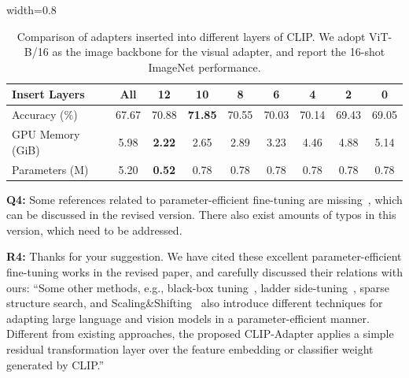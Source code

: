 \documentclass[default]{sn-jnl}%
\theoremstyle{thmstyleone}%
\theoremstyle{thmstyletwo}%
\theoremstyle{thmstylethree}%
\begin{document}
\begin{table}[h]
\centering
\caption{Comparison of adapters inserted into different layers of CLIP. We adopt ViT-B/16 as the image backbone for the visual adapter, and report the 16-shot ImageNet performance.}
\vspace*{5pt}
\begin{adjustbox}{width=0.8\linewidth}
	\begin{tabular}{lcccccccc}
	\toprule
		Insert Layers & All    & 12  &  10  &  8 & 6 & 4 & 2 &0 \\
		\midrule
		Accuracy (\%)  & 67.67		&70.88		&\textbf{71.85}	&70.55		&70.03		&70.14	   	&69.43		&69.05 \\
		GPU Memory (GiB)  & 5.98	 &	\textbf{2.22}		 &2.65	 &	2.89	 &	3.23		 &4.46		 &4.88		 &5.14 \\
            Parameters (M)  & 5.20	&	\textbf{0.52}		&0.78		&0.78	&	0.78		&0.78		&0.78		&0.78 \\
	\bottomrule
	\end{tabular}
\end{adjustbox}
\label{tab:insert}
\end{table}


\vspace{0.4cm}
\noindent \textbf{Q4:} Some references related to parameter-efficient fine-tuning are missing~\cite{lian2022scaling,hu2022sparse,sung2022lst,sun2022black}, which can be discussed in the revised version. There also exist amounts of typos in this version, which need to be addressed.

\vspace{0.1cm}
\noindent \textbf{R4:} Thanks for your suggestion. We have cited these excellent parameter-efficient fine-tuning works in the revised paper, and carefully discussed their relations with ours: ``Some other methods, e.g., black-box tuning~\cite{sun2022black}, ladder side-tuning~\cite{sung2022lst}, sparse structure search\cite{hu2022sparse}, and Scaling\&Shifting~\cite{lian2022scaling} also introduce different techniques for adapting large language and vision models in a parameter-efficient manner.
Different from existing approaches, the proposed CLIP-Adapter applies a simple residual transformation layer over the feature embedding or classifier weight generated by CLIP.''





\end{document}

